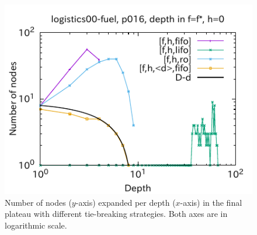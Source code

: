 \begin{figure}[htbp]
\includegraphics[width=0.49\linewidth]{img/output-lmcut/logistics00-fuel/p016-0.pdf}
 \caption{Number of nodes ($y$-axis) expanded per depth ($x$-axis) in
 the final plateau with different tie-breaking strategies. Both axes are in logarithmic scale.
 }
 \label{fig:depth-histogram}
\end{figure}

